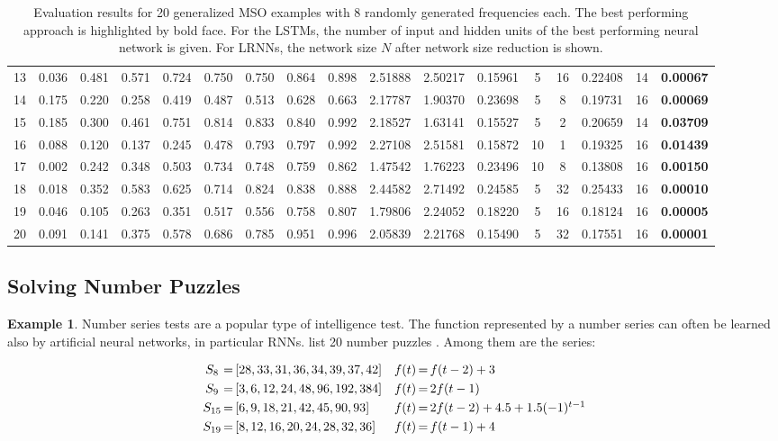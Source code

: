 \documentclass[twoside,11pt]{article}
\theoremstyle{definition}
\newtheorem{exmp}{Example}
\begin{document}
\begin{table}
\begin{tabular}{c*{8}{p{8mm}}cccc@{\,+\,}cccc}
	13 & 0.036 & 0.481 & 0.571 & 0.724 & 0.750 & 0.750 & 0.864 & 0.898 & 2.51888 & 2.50217 & 0.15961 & 5 & 16 & 0.22408 & 14 & \textbf{0.00067}\\
	14 & 0.175 & 0.220 & 0.258 & 0.419 & 0.487 & 0.513 & 0.628 & 0.663 & 2.17787 & 1.90370 & 0.23698 & 5 & 8 & 0.19731 & 16 & \textbf{0.00069}\\
	15 & 0.185 & 0.300 & 0.461 & 0.751 & 0.814 & 0.833 & 0.840 & 0.992 & 2.18527 & 1.63141 & 0.15527 & 5 & 2 & 0.20659 & 14 & \textbf{0.03709}\\
	16 & 0.088 & 0.120 & 0.137 & 0.245 & 0.478 & 0.793 & 0.797 & 0.992 & 2.27108 & 2.51581 & 0.15872 & 10 & 1 & 0.19325 & 16 & \textbf{0.01439}\\
	17 & 0.002 & 0.242 & 0.348 & 0.503 & 0.734 & 0.748 & 0.759 & 0.862 & 1.47542 & 1.76223 & 0.23496 & 10 & 8 & 0.13808 & 16 & \textbf{0.00150}\\
	18 & 0.018 & 0.352 & 0.583 & 0.625 & 0.714 & 0.824 & 0.838 & 0.888 & 2.44582 & 2.71492 & 0.24585 & 5 & 32 & 0.25433 & 16 & \textbf{0.00010}\\
	19 & 0.046 & 0.105 & 0.263 & 0.351 & 0.517 & 0.556 & 0.758 & 0.807 & 1.79806 & 2.24052 & 0.18220 & 5 & 16 & 0.18124 & 16 & \textbf{0.00005}\\
	20 & 0.091 & 0.141 & 0.375 & 0.578 & 0.686 & 0.785 & 0.951 & 0.996 & 2.05839 & 2.21768 & 0.15490 & 5 & 32 & 0.17551 & 16 & \textbf{0.00001}\\
	\bottomrule
  \end{tabular}
\caption{Evaluation results for 20 generalized MSO examples with 8 randomly
generated frequencies each. The best performing approach is highlighted by bold
face. For the LSTMs, the number of input and hidden units of the best performing
neural network is given. For LRNNs, the network size $N$ after network size
reduction is shown.}
\label{sideways}
\end{table}

\subsection{Solving Number Puzzles}

\begin{exmp}
Number series tests are a popular type of intelligence test. The function
represented by a number series can often be learned also by artificial neural
networks, in particular RNNs. \citet{GW13} list 20 number puzzles \citep[cf.][]{RK11}.
Among them are the series:

\[ \begin{array}{c@{\,=\,}lc@{\,=\,}l}
	S_8 & [28,33,31,36,34,39,37,42] & f(t) & f(t-2) + 3\\[3pt]
	S_9 & [3,6,12,24,48,96,192,384] & f(t) & 2 f(t-1)\\[3pt]
	S_{15} & [6,9,18,21,42,45,90,93] & f(t) & 2 f(t-2) + 4.5 + 1.5 (-1)^{t-1}\\[3pt]
	S_{19} & [8,12,16,20,24,28,32,36] & f(t) & f(t-1) + 4
\end{array} \]
\end{exmp}
\end{document}
